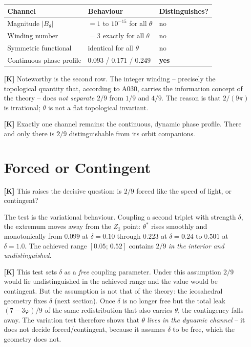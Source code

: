 \begin{center}
\begin{tabular}{lll}
\hline
Channel & Behaviour & Distinguishes? \\
\hline
Magnitude $|B_\theta|$ & $=1$ to $10^{-15}$ for all $\theta$ & no \\
Winding number & $=3$ exactly for all $\theta$ & no \\
Symmetric functional & identical for all $\theta$ & no \\
Continuous phase profile & $0{.}093$ / $0{.}171$ / $0{.}249$ & \textbf{yes} \\
\hline
\end{tabular}
\end{center}

\textbf{[K]} Noteworthy is the second row. The integer winding -- precisely the
topological quantity that, according to A030, carries the information concept of
the theory -- does \emph{not separate $2/9$} from $1/9$ and $4/9$. The reason is
that $2/(9\pi)$ is irrational; $\theta$ is not a flat topological invariant.

\textbf{[K]} Exactly one channel remains: the continuous, dynamic phase profile.
There and only there is $2/9$ distinguishable from its orbit companions.

\section{Forced or Contingent}

\textbf{[K]} This raises the decisive question: is $2/9$ forced like the speed of
light, or contingent?

The test is the variational behaviour. Coupling a second triplet with strength
$\delta$, the extremum moves away from the $Z_3$ point: $\theta^*$ rises smoothly
and monotonically from $0{.}099$ at $\delta = 0{.}10$ through $0{.}223$ at
$\delta = 0{.}24$ to $0{.}501$ at $\delta = 1{.}0$. The achieved range
$[0{.}05;\,0{.}52]$ contains $2/9$ \emph{in the interior and undistinguished}.

\textbf{[K]} This test sets $\delta$ as a \emph{free} coupling parameter. Under
this assumption $2/9$ would lie undistinguished in the achieved range and the
value would be contingent. But the assumption is not that of the theory: the
icosahedral geometry fixes $\delta$ (next section). Once $\delta$ is no longer
free but the total leak $(7-3\varphi)/9$ of the same redistribution that also
carries $\theta$, the contingency falls away. The variation test therefore shows
that $\theta$ \emph{lives in the dynamic channel} -- it does not decide
forced/contingent, because it assumes $\delta$ to be free, which the geometry
does not.

